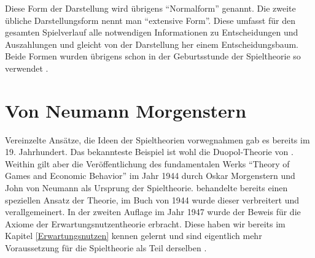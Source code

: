 
Diese Form der Darstellung wird übrigens "`Normalform"' genannt. Die zweite übliche Darstellungsform nennt man "`extensive Form"'. Diese umfasst für den gesamten Spielverlauf alle notwendigen Informationen zu Entscheidungen und Auszahlungen und gleicht von der Darstellung her einem Entscheidungsbaum. Beide Formen wurden übrigens schon in der Geburtsstunde der Spieltheorie so verwendet \parencite{Selten2001}.


\section{Von Neumann Morgenstern}

Vereinzelte Ansätze, die Ideen der Spieltheorien vorwegnahmen gab es bereits im 19. Jahrhundert. Das bekannteste Beispiel ist wohl die Duopol-Theorie von \textcite{Cournot1836}. Weithin gilt aber die Veröffentlichung des fundamentalen Werks "`Theory of Games and Economic Behavior"' im Jahr 1944 durch Oskar Morgenstern und John von Neumann als Ursprung der Spieltheorie. \textcite{VonNeumann1928} behandelte bereits einen speziellen Ansatz der Theorie, im Buch von 1944 wurde dieser verbreitert und verallgemeinert. In der zweiten Auflage im Jahr 1947 wurde der Beweis für die Axiome der Erwartungsnutzentheorie erbracht. Diese haben wir bereits im Kapitel \ref{Erwartungsnutzen} kennen gelernt und sind eigentlich mehr Voraussetzung für die Spieltheorie als Teil derselben \parencite[S. 3]{Selten2001}. 

